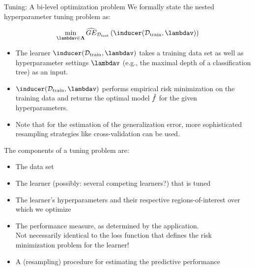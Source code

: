 \documentclass[11pt,compress,t,notes=noshow, xcolor=table]{beamer}
\begin{document}
\begin{vbframe}{Tuning: A bi-level optimization problem} 
We formally state the nested hyperparameter tuning problem as: 

$$
\min_{\lambdav \in \bm{\Lambda}} \GEh{\Dtest}\left(\inducer(\Dtrain, \lambdav)\right) 
$$

\begin{itemize}
\item The learner $\inducer(\Dtrain, \lambdav)$ takes a training data set as well as hyperparameter settings $\lambdav$ (e.g., the maximal depth of a classification tree) as an input. 
\item $\inducer(\Dtrain, \lambdav)$ performs empirical risk minimization on the training data and returns the optimal model $\hat{f}$ for the given hyperparameters. 
\item Note that for the estimation of the generalization error, more sophisticated resampling strategies like cross-validation can be used.
\end{itemize}

\framebreak

The components of a tuning problem are: 

\begin{itemize}
\item The data set
\item The learner (possibly: several competing learners?) that is tuned %
\item The learner's hyperparameters and their respective regions-of-interest over which we optimize %
\item The performance measure, as determined by the application.\\ Not necessarily identical to the loss function that defines the risk minimization problem for the learner!\\ 
\item A (resampling) procedure for estimating the predictive performance
\end{itemize}



\end{vbframe}
\end{document}
